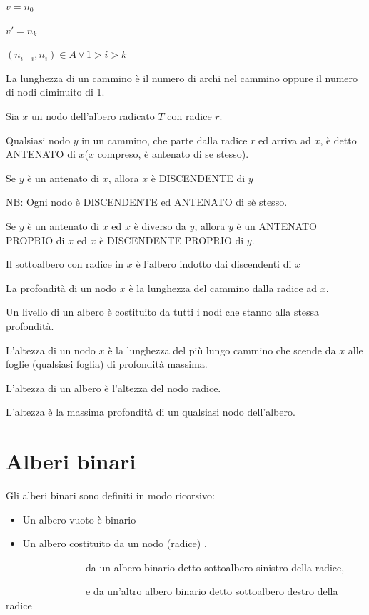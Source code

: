 $v=n_0$

$v'=n_k$

$(n_{i-i},n_i) \in A\,\forall\,1>i>k$

{La lunghezza di un cammino è il numero di archi nel cammino oppure il numero di nodi diminuito di 1.}

{Sia $x$ un nodo dell'albero radicato $T$ con radice $r$.}

{Qualsiasi nodo $y$ in un cammino, che parte dalla radice $r$ ed arriva ad $x$, è detto ANTENATO di $x$($x$ compreso, è antenato di se stesso).}

{Se $y$ è un antenato di $x$, allora $x$ è DISCENDENTE di $y$}

{NB: Ogni nodo è DISCENDENTE ed ANTENATO di sè stesso.}

{Se $y$ è un antenato di $x$ ed $x$ è diverso da $y$, allora $y$ è un ANTENATO PROPRIO di $x$ ed $x$ è DISCENDENTE PROPRIO di $y$.}

{Il sottoalbero con radice in $x$ è l'albero indotto dai discendenti di $x$}

{La profondità di un nodo $x$ è la lunghezza del cammino dalla radice ad $x$.}

{Un livello di un albero è costituito da tutti i nodi che stanno alla stessa profondità. }

{L'altezza di un nodo $x$ è la lunghezza del più lungo cammino che scende da $x$ alle foglie (qualsiasi foglia) di profondità massima.}

{L'altezza di un albero è l'altezza del nodo radice.}

{L'altezza è la massima profondità di un qualsiasi nodo dell'albero.}

\section{Alberi binari}

{Gli alberi binari sono definiti in modo ricorsivo:}

\begin{itemize}
\tightlist
\item
  {Un albero vuoto è binario}
\item
  {Un albero costituito da un nodo (radice) ,}
\end{itemize}

{~~~~~~~~~~~~~~~~da un albero binario detto sottoalbero sinistro della
radice,}

{~~~~~~~~~~~~~~~~e da un'altro albero binario detto sottoalbero destro
della radice}

